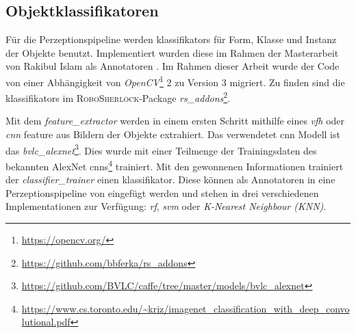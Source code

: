 \subsection{Objektklassifikatoren}
\label{sec:classifiers}
Für die Perzeptionspipeline werden \glspl{klassifikator} für Form, Klasse und Instanz der Objekte benutzt. Implementiert wurden diese im Rahmen der Masterarbeit von Rakibul Islam als \robosherlock Annotatoren \cite{rakib}. Im Rahmen dieser Arbeit wurde der Code von einer Abhängigkeit von \textit{OpenCV}\footnote{\url{https://opencv.org/}} 2 zu Version 3 migriert. Zu finden sind die \glspl{klassifikator} im \textsc{RoboSherlock}-Package \textit{rs\_addons}\footnote{\url{https://github.com/bbferka/rs\_addons}}. \par
Mit dem \textit{feature\_extractor} werden in einem ersten Schritt mithilfe eines \textit{\gls{vfh}} oder \textit{\gls{cnn}} \gls{feature} aus Bildern der Objekte extrahiert. Das verwendetet \gls{cnn} Modell ist das \textit{bvlc\_alexnet}\footnote{\url{https://github.com/BVLC/caffe/tree/master/models/bvlc\_alexnet}}. Dies wurde mit einer Teilmenge der Trainingsdaten des bekannten AlexNet \gls{cnn}s\footnote{\url{https://www.cs.toronto.edu/~kriz/imagenet_classification_with_deep_convolutional.pdf}} trainiert. Mit den gewonnenen Informationen trainiert der \textit{classifier\_trainer} einen \gls{klassifikator}. Diese können als Annotatoren in eine Perzeptionspipeline von \robosherlock eingefügt werden und stehen in drei verschiedenen Implementationen zur Verfügung: \textit{\gls{rf}}, \textit{\gls{svm}} oder \textit{K-Nearest Neighbour (KNN)}.

